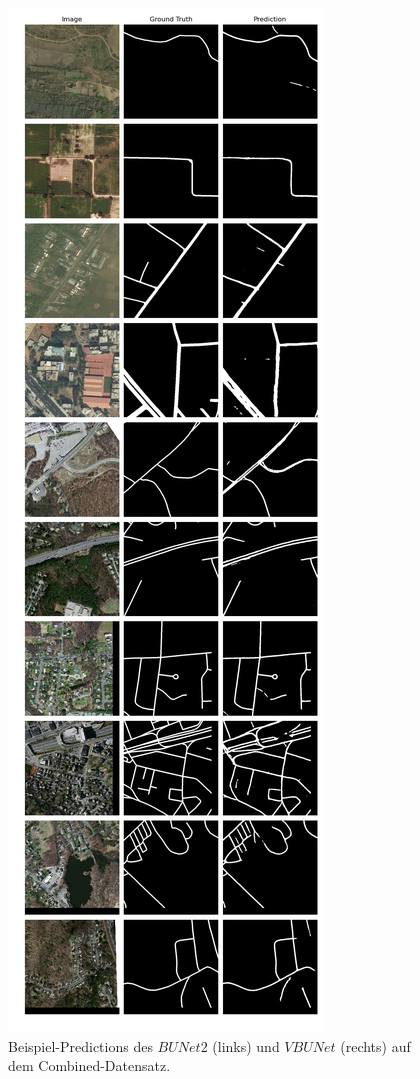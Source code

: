 \begin{figure}
\begin{minipage}{.41\textwidth}
	\end{minipage}
	\begin{minipage}{.41\textwidth}
		\centering
		\includegraphics[width=1.\linewidth]{Bilder/Samples-Combined/vbunet.png}
	\end{minipage}

	\caption{Beispiel-Predictions des $BUNet2$ (links) und $VBUNet$ (rechts) auf dem Combined-Datensatz.}
	\label{fig:combined-samples-bune2-vbunet}
\end{figure}

